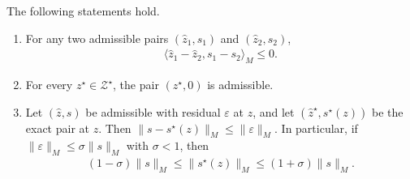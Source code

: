 \begin{lemma}\label{lem:acc-monotone}
    The following statements hold.
    \begin{enumerate}
        \item For any two admissible pairs $(\hat z_1, s_1)$ and $(\hat z_2, s_2)$,
        \begin{align}
            \langle \hat z_1 - \hat z_2, s_1 - s_2\rangle_M \le 0. \label{eq:acc-two-point}
        \end{align}
        \item For every $z^\star \in \mathcal{Z}^\star$, the pair $(z^\star, 0)$ is admissible.
        \item Let $(\hat z, s)$ be admissible with residual $\varepsilon$ at $z$, and let $(\hat z^\star, s^\star(z))$ be the exact pair at $z$.
        Then $\|s - s^\star(z)\|_M \le \|\varepsilon\|_M$.
        In particular, if $\|\varepsilon\|_M \le \sigma\|s\|_M$ with $\sigma < 1$, then
        \begin{align}
            (1-\sigma)\|s\|_M \le \|s^\star(z)\|_M \le (1+\sigma)\|s\|_M. \label{eq:acc-exact-vs-inexact}
        \end{align}
    \end{enumerate}
\end{lemma}
